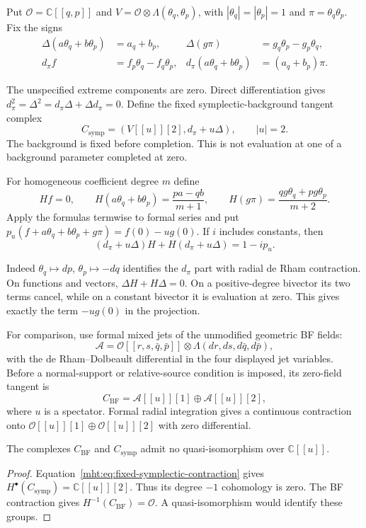 Put $\mathcal O=\mathbb C[[q,p]]$ and
$V=\mathcal O\otimes\Lambda(\theta_q,\theta_p)$, with
$|\theta_q|=|\theta_p|=1$ and $\pi=\theta_q\theta_p$.
Fix the signs
\begin{align*}
 \Delta(a\theta_q+b\theta_p)&=a_q+b_p,&
 \Delta(g\pi)&=g_q\theta_p-g_p\theta_q,\\
 d_\pi f&=f_p\theta_q-f_q\theta_p,&
 d_\pi(a\theta_q+b\theta_p)&=(a_q+b_p)\pi.
\end{align*}

The unspecified extreme components are zero. Direct
differentiation gives $d_\pi^2=\Delta^2=d_\pi\Delta+\Delta d_\pi=0$.
Define the fixed symplectic-background tangent complex
\[
 C_{\mathrm{symp}}=(V[[u]][2],d_\pi+u\Delta),
 \qquad |u|=2.
\]
The background is fixed before completion. This is not
evaluation at one of a background parameter completed
at zero.

For homogeneous coefficient degree $m$ define
\[
 Hf=0,\qquad
 H(a\theta_q+b\theta_p)=\frac{pa-qb}{m+1},\qquad
 H(g\pi)=\frac{qg\theta_q+pg\theta_p}{m+2}.
\]
Apply the formulas termwise to formal series and put
$p_u(f+a\theta_q+b\theta_p+g\pi)=f(0)-ug(0)$.
If $i$ includes constants, then
\begin{equation}\label{mht:eq:fixed-symplectic-contraction}
 (d_\pi+u\Delta)H+H(d_\pi+u\Delta)=1-ip_u.
\end{equation}

Indeed $\theta_q\mapsto dp$, $\theta_p\mapsto-dq$ identifies
the $d_\pi$ part with radial de Rham contraction.
On functions and vectors, $\Delta H+H\Delta=0$.
On a positive-degree bivector its two terms cancel, while
on a constant bivector it is evaluation at zero.
This gives exactly the term $-ug(0)$ in the projection.

For comparison, use formal mixed jets of the unmodified
geometric BF fields:
\[
 \mathcal A=\mathcal O[[r,s,\bar q,\bar p]]
       \otimes\Lambda(dr,ds,d\bar q,d\bar p),
\]
with the de Rham--Dolbeault differential in the four
displayed jet variables. Before a normal-support or
relative-source condition is imposed, its zero-field
tangent is
\[
 C_{\mathrm{BF}}=\mathcal A[[u]][1]\oplus\mathcal A[[u]][2],
\]
where $u$ is a spectator. Formal radial integration gives
a continuous contraction onto
$\mathcal O[[u]][1]\oplus\mathcal O[[u]][2]$ with zero differential.

\begin{proposition}\label{mht:prop:unchanged-tangent-obstruction}
The complexes $C_{\mathrm{BF}}$ and $C_{\mathrm{symp}}$
admit no quasi-isomorphism over $\mathbb C[[u]]$.
\end{proposition}
\begin{proof}
Equation~\eqref{mht:eq:fixed-symplectic-contraction} gives
$H^\bullet(C_{\mathrm{symp}})=\mathbb C[[u]][2]$.
Thus its degree $-1$ cohomology is zero. The BF contraction
gives $H^{-1}(C_{\mathrm{BF}})=\mathcal O$.
A quasi-isomorphism would identify these groups.
\end{proof}

